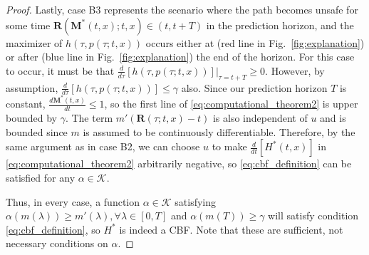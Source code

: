 \documentclass[10pt,conference]{ieeeconf}
\renewcommand{\(}{\left(}
\renewcommand{\)}{\right)}
\renewcommand{\[}{\left[}
\renewcommand{\]}{\right]}
\begin{document}
\begin{proof}
Lastly, case B3 represents the scenario where the path becomes unsafe for some time $\boldsymbol{R}(\boldsymbol{M}^*(t,x);t,x) \in (t,t+T)$ in the prediction horizon, and the maximizer of $h(\tau,p(\tau;t,x))$ occurs either at (red line in Fig.~\ref{fig:explanation}) or after (blue line in Fig.~\ref{fig:explanation}) the end of the horizon. For this case to occur, it must be that $\frac{d}{d\tau}\left. [h(\tau,p(\tau;t,x))] \right|_{\tau=t+T} \geq 0$. However, by assumption, $\frac{d}{d\tau}[h(\tau,p(\tau;t,x))] \leq \gamma$ also. Since our prediction horizon $T$ is constant, $\frac{d\boldsymbol{M}^*(t,x)}{dt} \leq 1$, so the first line of \eqref{eq:computational_theorem2} is upper bounded by $\gamma$. The term $m'(\boldsymbol{R}(\tau;t,x) - t)$ is also independent of $u$ and is bounded since $m$ is assumed to be continuously differentiable. Therefore, by the same argument as in case B2, we can choose $u$ to make $\frac{d}{dt}[H^*(t,x)]$ in \eqref{eq:computational_theorem2} arbitrarily negative, so \eqref{eq:cbf_definition} can be satisfied for any $\alpha \in \mathcal{K}$.

Thus, in every case, a function $\alpha\in\mathcal{K}$ satisfying $\alpha(m(\lambda)) \geq m'(\lambda), \forall \lambda \in [0,T]$ and $\alpha(m(T)) \geq \gamma$ will satisfy condition \eqref{eq:cbf_definition}, so $H^*$ is indeed a CBF. Note that these are sufficient, not necessary conditions on $\alpha$.
\end{proof}
\end{document}
